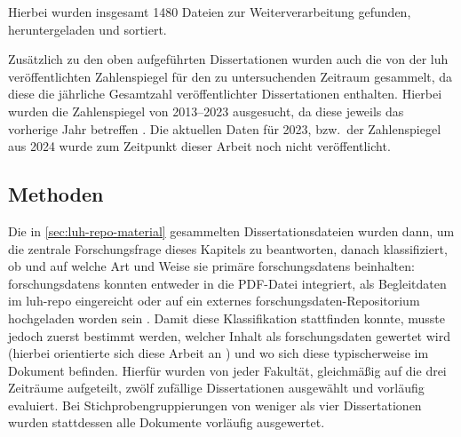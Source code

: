 Hierbei wurden insgesamt \num{1480} Dateien zur Weiterverarbeitung gefunden, heruntergeladen und sortiert.

Zusätzlich zu den oben aufgeführten Dissertationen wurden auch die von der \gls{luh} veröffentlichten Zahlenspiegel für den zu untersuchenden Zeitraum gesammelt, da diese die jährliche Gesamtzahl veröffentlichter Dissertationen enthalten.
Hierbei wurden die Zahlenspiegel von 2013--2023 ausgesucht, da diese jeweils das vorherige Jahr betreffen \autocite{Zahlenspiegel2013,Zahlenspiegel2014,Zahlenspiegel2015,Zahlenspiegel2016,Zahlenspiegel2017,Zahlenspiegel2018,Zahlenspiegel2019,Zahlenspiegel2020,Zahlenspiegel2021,Zahlenspiegel2022,Zahlenspiegel2023}.
Die aktuellen Daten für 2023, bzw.~der Zahlenspiegel aus 2024 wurde zum Zeitpunkt dieser Arbeit noch nicht veröffentlicht.

\subsection{Methoden}\label{sec:luh-repo-methods}
Die in \cref{sec:luh-repo-material} gesammelten Dissertationsdateien wurden dann, um die zentrale Forschungsfrage dieses Kapitels zu beantworten, danach klassifiziert, ob und auf welche Art und Weise sie primäre \glspl{forschungsdaten} beinhalten:
\glspl{forschungsdaten} konnten entweder in die PDF-Datei integriert, als Begleitdaten im \gls{luh-repo} eingereicht oder auf ein externes \gls{forschungsdaten}-Repositorium hochgeladen worden sein \autocite{ReillyEtAl2011}.
Damit diese Klassifikation stattfinden konnte, musste jedoch zuerst bestimmt werden, welcher Inhalt als \gls{forschungsdaten} gewertet wird (hierbei orientierte sich diese Arbeit an \autocite{dfg-richtlinie,Simukovic2014InterviewFD}) und wo sich diese typischerweise im Dokument befinden.
Hierfür wurden von jeder Fakultät, gleichmäßig auf die drei Zeiträume aufgeteilt, zwölf zufällige Dissertationen ausgewählt und vorläufig evaluiert.
Bei Stichprobengruppierungen von weniger als vier Dissertationen wurden stattdessen alle Dokumente vorläufig ausgewertet.

